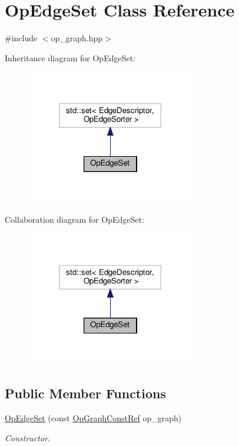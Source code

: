 \hypertarget{classOpEdgeSet}{}\section{Op\+Edge\+Set Class Reference}
\label{classOpEdgeSet}


{\ttfamily \#include $<$op\+\_\+graph.\+hpp$>$}



Inheritance diagram for Op\+Edge\+Set\+:
\nopagebreak
\begin{figure}[H]
\begin{center}
\leavevmode
\includegraphics[width=209pt]{d5/d78/classOpEdgeSet__inherit__graph}
\end{center}
\end{figure}


Collaboration diagram for Op\+Edge\+Set\+:
\nopagebreak
\begin{figure}[H]
\begin{center}
\leavevmode
\includegraphics[width=209pt]{df/dfc/classOpEdgeSet__coll__graph}
\end{center}
\end{figure}
\subsection*{Public Member Functions}
\begin{DoxyCompactItemize}
\item 
\hyperlink{classOpEdgeSet_a53ee231ba7edd0e15a75390e41cba37b}{Op\+Edge\+Set} (const \hyperlink{op__graph_8hpp_a9a0b240622c47584bee6951a6f5de746}{Op\+Graph\+Const\+Ref} op\+\_\+graph)
\begin{DoxyCompactList}\small\item\em Constructor. \end{DoxyCompactList}\end{DoxyCompactItemize}


